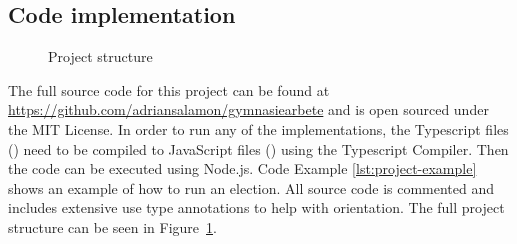 \documentclass[12pt]{article}
\begin{document}
\printbibliography{}
\pagebreak
\begin{appendices}
\section{Code implementation}
\begin{figure}[H]
\caption{Project structure}
\label{fig:project-structure}
\end{figure}
The full source code for this project can be found at \url{https://github.com/adriansalamon/gymnasiearbete} and is open sourced under the MIT License. In order to run any of the implementations, the Typescript files () need to be compiled to JavaScript files () using the Typescript Compiler. Then the code can be executed using Node.js. Code Example \ref{lst:project-example} shows an example of how to run an election.
All source code is commented and includes extensive use type annotations to help with orientation. The full project structure can be seen in Figure~\ref{fig:project-structure}.


\end{appendices}
\end{document}
